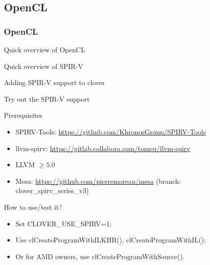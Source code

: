 \documentclass[11pt,english,compress]{beamer}
\begin{document}
\subsection{OpenCL}
\begin{frame}
	\frametitle{OpenCL}

	\begin{block}{}
	\end{block}

\end{frame}

\begin{frame}{Quick overview of OpenCL}
\end{frame}

\begin{frame}{Quick overview of SPIR-V}
\end{frame}

\begin{frame}{Adding SPIR-V support to clover}
	\begin{block}{}
	\end{block}
\end{frame}

\begin{frame}{Try out the SPIR-V support}
	\begin{block}{Prerequisites}
		\begin{itemize}
			\item SPIRV-Tools:
				\url{https://github.com/KhronosGroup/SPIRV-Tools}
			\item llvm-spirv:
				\url{https://gitlab.collabora.com/tomeu/llvm-spirv}
			\item LLVM $\geq 5.0$
			\item Mesa: \url{https://github.com/pierremoreau/mesa}
				(branch: clover\_spirv\_series\_v3)
		\end{itemize}
	\end{block}
	\begin{block}{How to use/test it?}
		\begin{itemize}
			\item Set CLOVER\_USE\_SPIRV=1;
			\item Use clCreateProgramWithILKHR(), clCreateProgramWithIL();
			\item Or for AMD owners, use clCreateProgramWithSource().
		\end{itemize}
	\end{block}
\end{frame}
\end{document}
